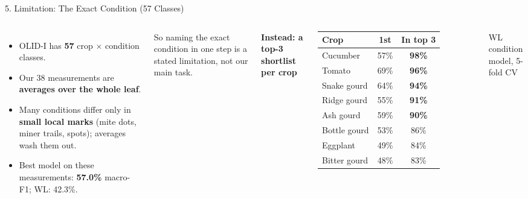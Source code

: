 \documentclass[aspectratio=169, 11pt]{beamer}
\begin{document}
\begin{frame}{5. Limitation: The Exact Condition (57 Classes)}
    \begin{columns}[T]
        \small
        \begin{itemize}
            \setlength{\itemsep}{0.2cm}
            \item OLID-I has \textbf{57} crop $\times$ condition classes.
            \item Our 38 measurements are \textbf{averages over the whole leaf}.
            \item Many conditions differ only in \textbf{small local marks} (mite dots, miner trails, spots); averages wash them out.
            \item Best model on these measurements: \textbf{57.0\%} macro-F1; WL: 42.3\%.
        \end{itemize}
        \vspace{0.1cm}
        {\scriptsize So naming the exact condition in one step is a stated limitation, not our main task.}

        \centering
        {\small \textbf{Instead: a top-3 shortlist per crop}}\\[0.1cm]
        \scriptsize
        \renewcommand{\arraystretch}{1.05}
        \begin{tabular}{@{}l c c@{}}
            \toprule
            \textbf{Crop} & \textbf{1st} & \textbf{In top 3} \\
            \midrule
            Cucumber & 57\% & \textbf{98\%} \\
            Tomato & 69\% & \textbf{96\%} \\
            Snake gourd & 64\% & \textbf{94\%} \\
            Ridge gourd & 55\% & \textbf{91\%} \\
            Ash gourd & 59\% & \textbf{90\%} \\
            Bottle gourd & 53\% & 86\% \\
            Eggplant & 49\% & 84\% \\
            Bitter gourd & 48\% & 83\% \\
            \bottomrule
        \end{tabular}

        {\scriptsize WL condition model, 5-fold CV}
    \end{columns}
    \vspace{0.15cm}
    \centering
\end{frame}
\end{document}
